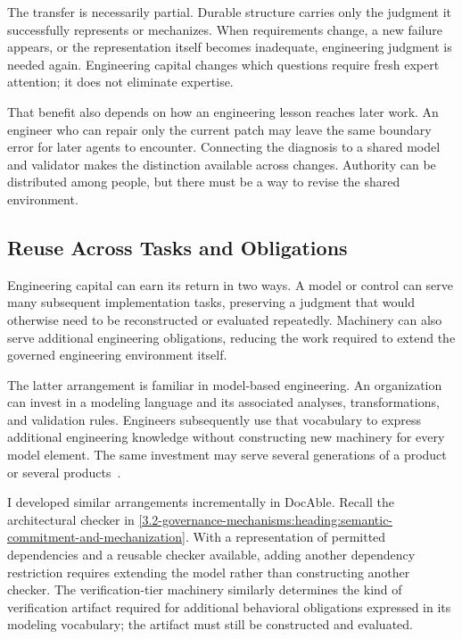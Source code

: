 The transfer is necessarily partial. Durable structure carries only the judgment it successfully represents or mechanizes. When requirements change, a new failure appears, or the representation itself becomes inadequate, engineering judgment is needed again. Engineering capital changes which questions require fresh expert attention; it does not eliminate expertise.


That benefit also depends on how an engineering lesson reaches later work. An engineer who can repair only the current patch may leave the same boundary error for later agents to encounter. Connecting the diagnosis to a shared model and validator makes the distinction available across changes. Authority can be distributed among people, but there must be a way to revise the shared environment.

\subsection*{Reuse Across Tasks and Obligations}\label{heading:reuse-across-tasks-and-obligations}

Engineering capital can earn its return in two ways. A model or control can serve many subsequent implementation tasks, preserving a judgment that would otherwise need to be reconstructed or evaluated repeatedly. Machinery can also serve additional engineering obligations, reducing the work required to extend the governed engineering environment itself.

The latter arrangement is familiar in model-based engineering. An organization can invest in a modeling language and its associated analyses, transformations, and validation rules. Engineers subsequently use that vocabulary to express additional engineering knowledge without constructing new machinery for every model element. The same investment may serve several generations of a product or several products~\citep{schmidt2006model,kelly2008domain}.

I developed similar arrangements incrementally in DocAble. Recall the architectural checker in \autoref{3.2-governance-mechanisms:heading:semantic-commitment-and-mechanization}. With a representation of permitted dependencies and a reusable checker available, adding another dependency restriction requires extending the model rather than constructing another checker. The verification-tier machinery similarly determines the kind of verification artifact required for additional behavioral obligations expressed in its modeling vocabulary; the artifact must still be constructed and evaluated.

